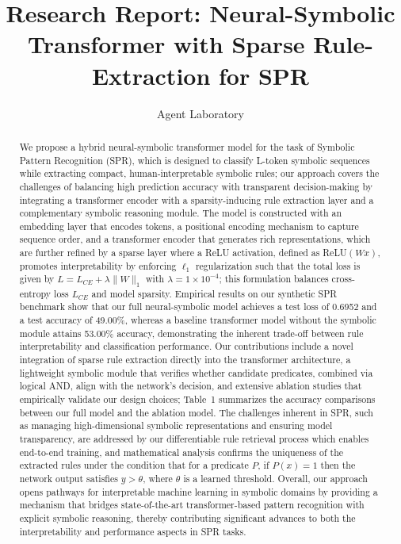 \documentclass{article}
\title{Research Report: Neural-Symbolic Transformer with Sparse Rule-Extraction for SPR}
\author{Agent Laboratory}
\date{}
\begin{document}
\maketitle

\begin{abstract}
We propose a hybrid neural-symbolic transformer model for the task of Symbolic Pattern Recognition (SPR), which is designed to classify L-token symbolic sequences while extracting compact, human‐interpretable symbolic rules; our approach covers the challenges of balancing high prediction accuracy with transparent decision-making by integrating a transformer encoder with a sparsity-inducing rule extraction layer and a complementary symbolic reasoning module. The model is constructed with an embedding layer that encodes tokens, a positional encoding mechanism to capture sequence order, and a transformer encoder that generates rich representations, which are further refined by a sparse layer where a ReLU activation, defined as ReLU$(W x)$, promotes interpretability by enforcing $\ell_1$ regularization such that the total loss is given by $L = L_{CE} + \lambda \|W\|_1$ with $\lambda=1 \times 10^{-4}$; this formulation balances cross-entropy loss $L_{CE}$ and model sparsity. Empirical results on our synthetic SPR benchmark show that our full neural-symbolic model achieves a test loss of 0.6952 and a test accuracy of 49.00\%, whereas a baseline transformer model without the symbolic module attains 53.00\% accuracy, demonstrating the inherent trade-off between rule interpretability and classification performance. Our contributions include a novel integration of sparse rule extraction directly into the transformer architecture, a lightweight symbolic module that verifies whether candidate predicates, combined via logical AND, align with the network’s decision, and extensive ablation studies that empirically validate our design choices; Table~1 summarizes the accuracy comparisons between our full model and the ablation model. The challenges inherent in SPR, such as managing high-dimensional symbolic representations and ensuring model transparency, are addressed by our differentiable rule retrieval process which enables end-to-end training, and mathematical analysis confirms the uniqueness of the extracted rules under the condition that for a predicate $P$, if $P(x)=1$ then the network output satisfies $y > \theta$, where $\theta$ is a learned threshold. Overall, our approach opens pathways for interpretable machine learning in symbolic domains by providing a mechanism that bridges state-of-the-art transformer-based pattern recognition with explicit symbolic reasoning, thereby contributing significant advances to both the interpretability and performance aspects in SPR tasks.
\end{abstract}
\end{document}
